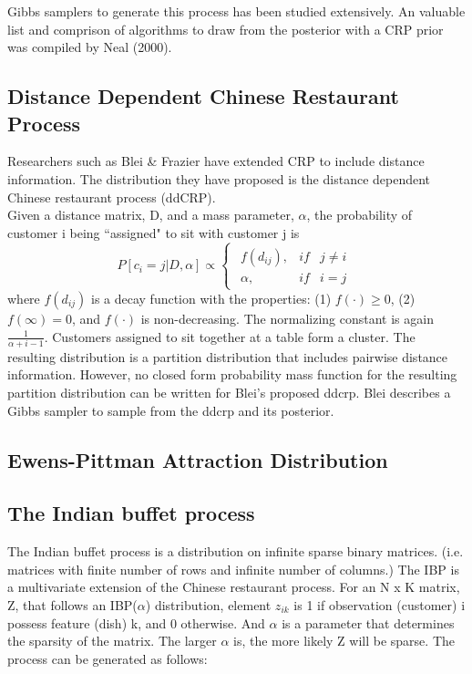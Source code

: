 \noindent
Gibbs samplers to generate this process has been studied extensively. 
An valuable list and comprison of algorithms to draw from the posterior with 
a CRP prior was compiled by Neal (2000).

\subsection{Distance Dependent Chinese Restaurant Process}
Researchers such as Blei \& Frazier have extended CRP to include 
distance information. The distribution they have proposed is the distance
dependent Chinese restaurant process (ddCRP). \\

\noindent
Given a distance matrix, D, and a mass parameter, $\alpha$, the probability
of customer i being ``assigned" to sit with customer j is 
\begin{equation}
  P[c_i=j|D,\alpha] \propto 
  \begin{cases}
    \begin{array}{rll}
      f(d_{ij}), & if & j \ne i\\
      \alpha,    & if & i=j
    \end{array}  
  \end{cases}
\end{equation}
where $f(d_{ij})$ is a decay function with the properties: (1) $f(\cdot) \ge 0$,
(2) $f(\infty) = 0$, and $f(\cdot)$ is non-decreasing. The normalizing constant 
is again $\frac{1}{\alpha+i-1}$. Customers assigned to sit together at a table
form a cluster. The resulting distribution is a partition distribution that
includes pairwise distance information. However, no closed form probability 
mass function for the resulting partition distribution can be written for 
Blei's proposed ddcrp. Blei describes a Gibbs sampler to sample from the 
ddcrp and its posterior.

\subsection{Ewens-Pittman Attraction Distribution}


\subsection{The Indian buffet process}
The Indian buffet process is a distribution on infinite sparse binary matrices.
(i.e. matrices with finite number of rows and infinite number of columns.) The
IBP is a multivariate extension of the Chinese restaurant process. For an N x K
matrix, Z, that follows an IBP($\alpha$) distribution, element $z_{ik}$ is 1 if
observation (customer) i possess feature (dish) k, and 0 otherwise.  And
$\alpha$ is a parameter that determines the sparsity of the matrix. The larger
$\alpha$ is, the more likely Z will be sparse. The process can be generated as
follows: \\

